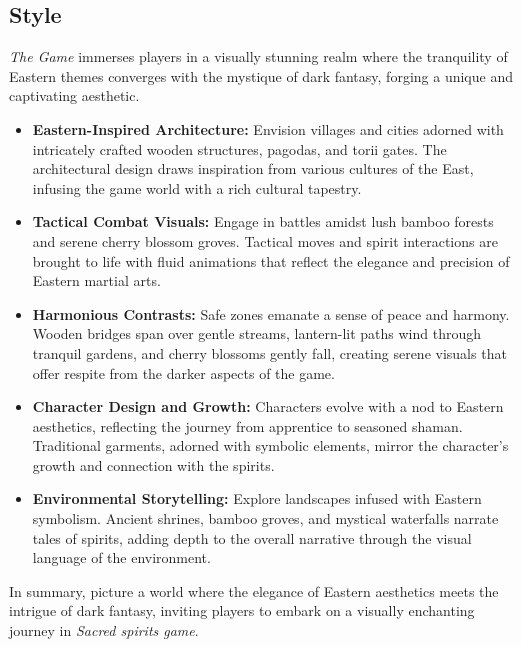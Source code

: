 \documentclass[a4paper,10pt,english]{article}
\begin{document}
\subsection*{Style}
\emph{The Game} immerses players in a visually stunning realm where the tranquility of Eastern themes converges with the mystique of dark fantasy, forging a unique and captivating aesthetic.

\begin{itemize}
    \item \textbf{Eastern-Inspired Architecture:} Envision villages and cities adorned with intricately crafted wooden structures, pagodas, and torii gates. The architectural design draws inspiration from various cultures of the East, infusing the game world with a rich cultural tapestry.
  
    \item \textbf{Tactical Combat Visuals:} Engage in battles amidst lush bamboo forests and serene cherry blossom groves. Tactical moves and spirit interactions are brought to life with fluid animations that reflect the elegance and precision of Eastern martial arts.
  
    \item \textbf{Harmonious Contrasts:} Safe zones emanate a sense of peace and harmony. Wooden bridges span over gentle streams, lantern-lit paths wind through tranquil gardens, and cherry blossoms gently fall, creating serene visuals that offer respite from the darker aspects of the game.
  
    \item \textbf{Character Design and Growth:} Characters evolve with a nod to Eastern aesthetics, reflecting the journey from apprentice to seasoned shaman. Traditional garments, adorned with symbolic elements, mirror the character's growth and connection with the spirits.
  
    \item \textbf{Environmental Storytelling:} Explore landscapes infused with Eastern symbolism. Ancient shrines, bamboo groves, and mystical waterfalls narrate tales of spirits, adding depth to the overall narrative through the visual language of the environment.
\end{itemize}

In summary, picture a world where the elegance of Eastern aesthetics meets the intrigue of dark fantasy, inviting players to embark on a visually enchanting journey in \emph{Sacred spirits game}.
\end{document}
